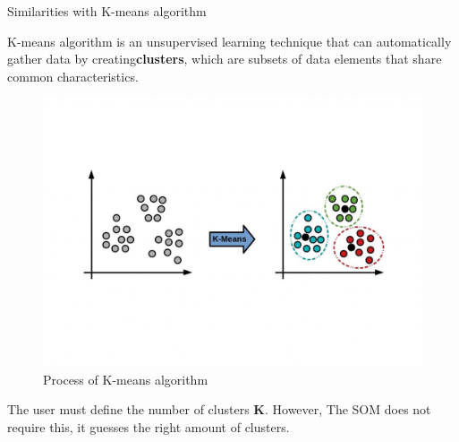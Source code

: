 \documentclass{beamer}
\begin{document}
	
	\begin{frame}{Similarities with K-means algorithm}
		
		K-means algorithm is an unsupervised learning technique that can automatically gather data by creating\textbf{clusters}, which are subsets of data elements that share common characteristics.

		\begin{center}
			
			\begin{figure}[h]
			
				\includegraphics[width=0.6\linewidth]{pics/kmeans.jpeg}
				\caption{Process of K-means algorithm}
			\end{figure}
		\end{center}
				
		The user must define the number of clusters \textbf{K}. However, The SOM does not require this, it guesses the right amount of clusters.

	\end{frame}
\end{document}
